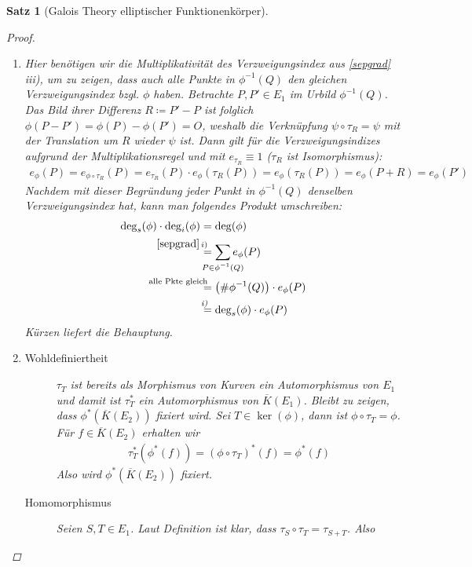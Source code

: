 \documentclass[english, german, parskip=half]{scrartcl}
\newtheorem{Satz}{Satz}[section]
\theoremstyle{definition}
\theoremstyle{remark}
\newcommand*{\algK}{\ensuremath{\overline K}} %
\newcommand*{\degs}{\operatorname{\deg}_s} %
\newcommand*{\degi}{\operatorname{\deg}_i} %
\begin{document}
\begin{Satz}[Galois Theory elliptischer Funktionenkörper]
\begin{proof}
\begin{enumerate}[label=\roman*)]
  \item Hier benötigen wir die Multiplikativität des Verzweigungsindex
    aus \autoref{sepgrad}\,iii), um zu zeigen, dass auch alle Punkte
    in $\phi^{-1}(Q)$ den gleichen Verzweigungsindex bzgl. $\phi$ haben.
    Betrachte $P,P'\in E_1$ im Urbild $\phi^{-1}(Q)$. Das Bild ihrer
    Differenz $R\coloneqq P'-P$ ist folglich
    $\phi(P-P')=\phi(P)-\phi(P')=O$, weshalb die Verknüpfung
    $\psi\circ\tau_R = \psi$ mit der Translation um $R$ wieder $\psi$
    ist.
    Dann gilt für die Verzweigungsindizes aufgrund der
    Multiplikationsregel und mit $e_{\tau_R}\equiv1$ ($\tau_R$ ist
    Isomorphismus):
    \begin{gather*}
      e_\phi(P) 
      = e_{\phi\circ\tau_R}(P) 
      = e_{\tau_R}(P) \cdot e_\phi(\tau_R(P))
      = e_\phi(\tau_R(P))
      = e_\phi(P+R)
      = e_\phi(P')
    \end{gather*}
    Nachdem mit dieser Begründung jeder Punkt in $\phi^{-1}(Q)$
    denselben Verzweigungsindex hat, kann man folgendes Produkt
    umschreiben:
    \begin{align*}
      \degs(\phi) \cdot \degi(\phi)
      &= \deg(\phi)\\
      &\overset{\mathllap{\ref{sepgrad}\,i)}}{=}
        \sum_{\mathclap{P\in\phi^{-1}(Q)}} e_\phi(P)\\
      &\overset{\mathllap{\text{alle Pkte gleich}}}{=}
        \left( \#\phi^{-1}(Q) \right) \cdot e_\phi(P)\\
      &\overset{\mathllap{\text{\emph{i)}}}}{=}
        \degs(\phi)\cdot e_\phi(P)
    \end{align*}
    Kürzen liefert die Behauptung.
    \item 
      \begin{description}
        \item[Wohldefiniertheit] $\tau_T$ ist bereits als Morphismus
          von Kurven ein Automorphismus von $E_1$ und damit ist
          $\tau_T^*$ ein Automorphismus von $\algK(E_1)$. Bleibt zu
          zeigen, dass $\phi^*(\algK(E_2))$ fixiert wird.
          Sei $T\in\ker(\phi)$, dann ist $\phi\circ\tau_T=\phi$.
          Für $f\in\algK(E_2)$ erhalten wir
          \begin{gather*}
            \tau_T^*(\phi^*(f)) = (\phi\circ\tau_T)^*(f) = \phi^*(f)
          \end{gather*}
          Also wird $\phi^*(\algK(E_2))$ fixiert.
        \item[Homomorphismus] Seien $S,T\in E_1$. Laut Definition ist
          klar, dass $\tau_S\circ\tau_T = \tau_{S+T}$. Also

\end{description}
\end{enumerate}
\end{proof}
\end{Satz}
\end{document}
